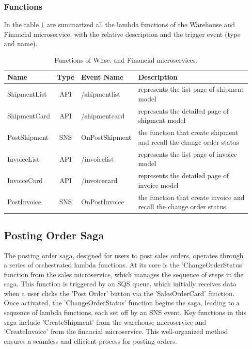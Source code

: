 \subsubsection{Functions}
In the table \ref{tab:5_whse_financial_functions} are summarized all the lambda functions of the Warehouse
and Financial microservice, with the relative description and the trigger event (type and name).

\begin{table}
    \centering
    \begin{tabular}{|l|c|l|m{6cm}|}
        \hline
        \textbf{Name} & \textbf{Type} & \textbf{Event Name} & \textbf{Description}                                                 \\ \hline
        ShipmentList  & API           & /shipmentlist       & represents the list page of shipment model                           \\ \hline
        ShipmentCard  & API           & /shipmentcard       & represents the detailed page of shipment model                       \\ \hline
        PostShipment  & SNS           & OnPostShipment      & the function that create shipment and recall the change order status \\ \hline
        InvoiceList   & API           & /invoicelist        & represents the list page of invoice model                            \\ \hline
        InvoiceCard   & API           & /invoicecard        & represents the detailed page of invoice model                        \\ \hline
        PostInvoice   & SNS           & OnPostInvoice       & the function that create invoice and recall the change order status  \\ \hline
    \end{tabular}
    \caption{Functions of Whse. and Financial microservices.}
    \label{tab:5_whse_financial_functions}
\end{table}

\subsection{Posting Order Saga}
The posting order saga, designed for users to post sales orders, operates through a series of
orchestrated lambda functions. At its core is the 'ChangeOrderStatus' function from the sales
microservice, which manages the sequence of steps in the saga. This function is triggered by an SQS
queue, which initially receives data when a user clicks the 'Post Order' button via the
'SalesOrderCard' function. Once activated, the 'ChangeOrderStatus' function begins the saga, leading
to a sequence of lambda functions, each set off by an SNS event. Key functions in this saga include
'CreateShipment' from the warehouse microservice and 'CreateInvoice' from the financial
microservice. This well-organized method ensures a seamless and efficient process for posting
orders.

